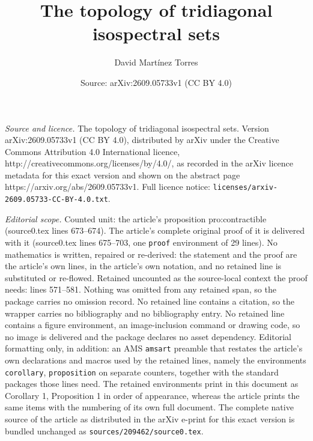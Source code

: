 \documentclass[10pt,a4paper]{amsart}
\title{The topology of tridiagonal isospectral sets}
\author{David Mart\'inez Torres}
\date{Source: arXiv:2609.05733v1 (CC BY 4.0)}
\begin{document}
\maketitle

\noindent\emph{Source and licence.} The topology of tridiagonal isospectral sets. Version arXiv:2609.05733v1 (CC BY 4.0), distributed by arXiv under the Creative Commons Attribution 4.0 International licence, http://creativecommons.org/licenses/by/4.0/, as recorded in the arXiv licence metadata for this exact version and shown on the abstract page https://arxiv.org/abs/2609.05733v1. Full licence notice: \texttt{licenses/arxiv-2609.05733-CC-BY-4.0.txt}.\par\smallskip

\noindent\textit{Editorial scope.} Counted unit: the article's proposition pro:contractible (source0.tex lines 673--674). The article's complete original proof of it is delivered with it (source0.tex lines 675--703, one \texttt{proof} environment of 29 lines). No mathematics is written, repaired or re-derived: the statement and the proof are the article's own lines, in the article's own notation, and no retained line is substituted or re-flowed.  Retained uncounted as the source-local context the proof needs: lines 571--581.  Nothing was omitted from any retained span, so the package carries no omission record.  No retained line contains a citation, so the wrapper carries no bibliography and no bibliography entry.  No retained line contains a figure environment, an image-inclusion command or drawing code, so no image is delivered and the package declares no asset dependency.  Editorial formatting only, in addition: an AMS \texttt{amsart} preamble that restates the article's own declarations and macros used by the retained lines, namely the environments \texttt{corollary}, \texttt{proposition} on separate counters, together with the standard packages those lines need.  The retained environments print in this document as Corollary 1, Proposition 1 in order of appearance, whereas the article prints the same items with the numbering of its own full document.  The complete native source of the article as distributed in the arXiv e-print for this exact version is bundled unchanged as \texttt{sources/209462/source0.tex}.
\end{document}
